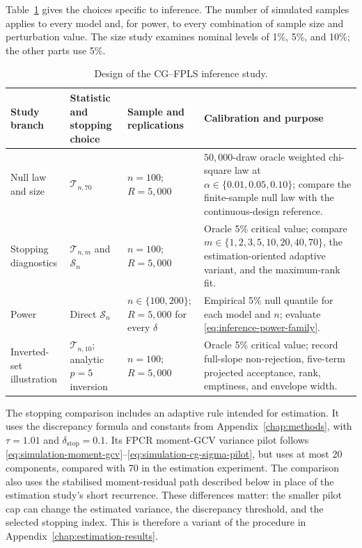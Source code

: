 Table~\ref{tab:inference-design} gives the choices specific to inference.
The number of simulated samples applies to every model and, for power, to
every combination of sample size and perturbation value.  The size study examines
nominal levels of 1\%, 5\%, and 10\%; the other parts use 5\%.

\begin{table}[htbp]
    \centering
    \caption[Inference-study design]{Design of the CG--FPLS inference study.}
    \label{tab:inference-design}
    \small
    \begin{tabular}{@{}
        >{\raggedright\arraybackslash}p{2.5cm}
        >{\raggedright\arraybackslash}p{2.5cm}
        >{\raggedright\arraybackslash}p{2.9cm}
        >{\raggedright\arraybackslash}p{5.25cm}@{}}
        \toprule
        Study branch & Statistic and stopping choice & Sample and replications & Calibration and purpose \\
        \midrule
        Null law and size
        & $\mathcal T_{n,70}$
        & $n=100$; $R=5{,}000$
        & $50{,}000$-draw oracle weighted chi-square law at
          $\alpha\in\{0.01,0.05,0.10\}$; compare the finite-sample null law
          with the continuous-design reference. \\
        Stopping diagnostics
        & $\mathcal T_{n,m}$ and $\mathcal S_n$
        & $n=100$; $R=5{,}000$
        & Oracle 5\% critical value; compare
          $m\in\{1,2,3,5,10,20,40,70\}$, the estimation-oriented adaptive
          variant, and the maximum-rank fit. \\
        Power
        & Direct $\mathcal S_n$
        & $n\in\{100,200\}$; $R=5{,}000$ for every $\delta$
        & Empirical 5\% null quantile for each model and $n$; evaluate
          \eqref{eq:inference-power-family}. \\
        Inverted-set illustration
        & $\mathcal T_{n,10}$; analytic $p=5$ inversion
        & $n=100$; $R=5{,}000$
        & Oracle 5\% critical value; record full-slope non-rejection,
          five-term projected acceptance, rank, emptiness, and envelope width. \\
        \bottomrule
    \end{tabular}
\end{table}

The stopping comparison includes an adaptive rule intended for estimation.
It uses the discrepancy formula and constants from
Appendix~\ref{chap:methods}, with $\tau=1.01$ and
$\delta_{\mathrm{stop}}=0.1$.  Its FPCR moment-GCV variance pilot follows
\eqref{eq:simulation-moment-gcv}--\eqref{eq:simulation-cg-sigma-pilot}, but
uses at most 20 components, compared with 70 in the estimation experiment.
The comparison also uses the stabilised moment-residual path described below
in place of the estimation study's short recurrence.  These differences
matter: the smaller pilot cap can change the estimated variance, the
discrepancy threshold, and the selected stopping index.  This is therefore a
variant of the procedure in Appendix~\ref{chap:estimation-results}.

